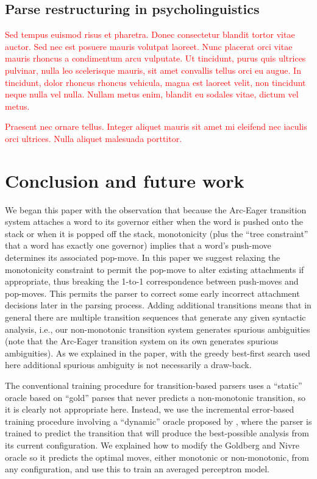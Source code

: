 \documentclass[11pt,letterpaper]{article}
\newcommand{\note}[1]{\textcolor{red}{#1}}
\begin{document}
\subsection{Parse restructuring in psycholinguistics}

\note{Sed tempus euismod risus et pharetra. Donec consectetur blandit tortor vitae auctor. Sed nec est posuere mauris volutpat laoreet. Nunc placerat orci vitae mauris rhoncus a condimentum arcu vulputate. Ut tincidunt, purus quis ultrices pulvinar, nulla leo scelerisque mauris, sit amet convallis tellus orci eu augue. In tincidunt, dolor rhoncus rhoncus vehicula, magna est laoreet velit, non tincidunt neque nulla vel nulla. Nullam metus enim, blandit eu sodales vitae, dictum vel metus.}

\note{Praesent nec ornare tellus. Integer aliquet mauris sit amet mi eleifend nec iaculis orci ultrices. Nulla aliquet malesuada porttitor.}


\section{Conclusion and future work}

\noindent
We began this paper with the observation that because the Arc-Eager transition system \citep{nivre:04}
attaches a word to its governor either when the word is pushed onto the stack or when it is
popped off the stack, monotonicity (plus the ``tree constraint'' that a word has exactly one governor)
implies that a word's push-move determines its associated pop-move. In this paper we suggest relaxing
the monotonicity constraint to permit the pop-move to alter existing attachments if appropriate,
thus breaking the 1-to-1 correspondence between push-moves and pop-moves.  This permits the parser
to correct some early incorrect attachment decisions later in the parsing process.
Adding additional transitions means
that in general there are multiple transition sequences that generate any given syntactic analysis,
i.e., our non-monotonic transition system generates spurious ambiguities (note that the
Arc-Eager transition system on its own generates spurious ambiguities).
As we explained in the paper, with the greedy best-first search used here additional
spurious ambiguity is
not necessarily a draw-back.

The conventional training procedure for transition-based parsers uses a ``static'' oracle
based on ``gold'' parses that never predicts a non-monotonic transition, so it is clearly not
appropriate here.  Instead, we use the incremental error-based training procedure involving
a ``dynamic'' oracle proposed by  \citet{goldberg:12}, where the parser is trained to
predict the transition that will produce
the best-possible analysis from its current configuration.  We explained how to modify the Goldberg
and Nivre oracle so it predicts the optimal moves, either monotonic or non-monotonic,
from any configuration, and use this to train an averaged perceptron model.
\end{document}
